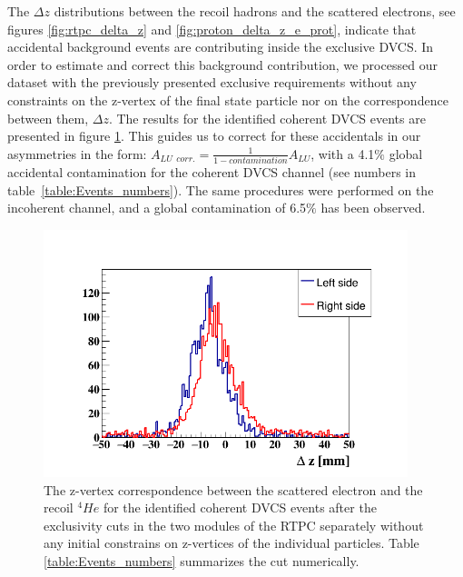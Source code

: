 The $\Delta z$ distributions between the recoil hadrons and the scattered 
electrons, see figures \ref{fig:rtpc_delta_z} and 
\ref{fig:proton_delta_z_e_prot}, indicate that accidental background events are 
contributing inside the exclusive DVCS. In order to estimate and correct 
this background contribution, we processed our dataset with the previously 
presented exclusive requirements without any constraints on the z-vertex of the 
final state particle nor on the correspondence between them, $\Delta z$. The 
results for the identified coherent DVCS events are presented in figure 
\ref{fig:delta_z_after_ex}. This guides us to correct for these accidentals in 
our asymmetries in the form: $ A_{LU~~corr.} = \frac{1}{1 - contamination} 
A_{LU}$, with a 4.1$\%$ global accidental contamination for the coherent DVCS 
channel (see numbers in table~\ref{table:Events_numbers}). The same procedures 
were performed on the incoherent channel, and a 
global contamination of 6.5$\%$ has been observed.

\begin{figure}[tbp]
\centering
\includegraphics[height=7.2cm]{fig_dvcs/rtpc_delta_z_acc.png}
\caption{The z-vertex correspondence between the scattered electron and the 
   recoil $^{4}He$ for the identified coherent DVCS events after the 
   exclusivity cuts in the two modules of the RTPC separately without any 
   initial constrains on z-vertices of the individual particles.  Table 
\ref{table:Events_numbers} summarizes the cut numerically.}
\label{fig:delta_z_after_ex}
 \end{figure}

